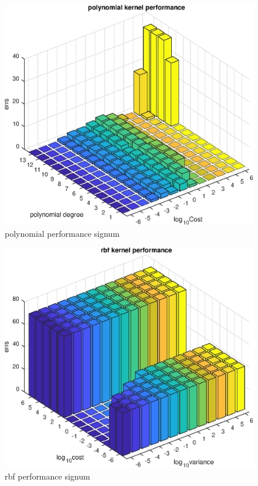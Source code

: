 \documentclass[a4paper,12pt]{article}
\begin{document}
\begin{figure}
\centering
\includegraphics[width=.7\textwidth]{figure/polynomial_performance_s.eps}
\caption{polynomial performance signum}
\label{ps}
\end{figure}
\begin{figure}
\centering
\includegraphics[width=.7\textwidth]{figure/rbf_performance_s.eps}
\caption{rbf performance signum}
\label{rs}
\end{figure}
\end{document}
